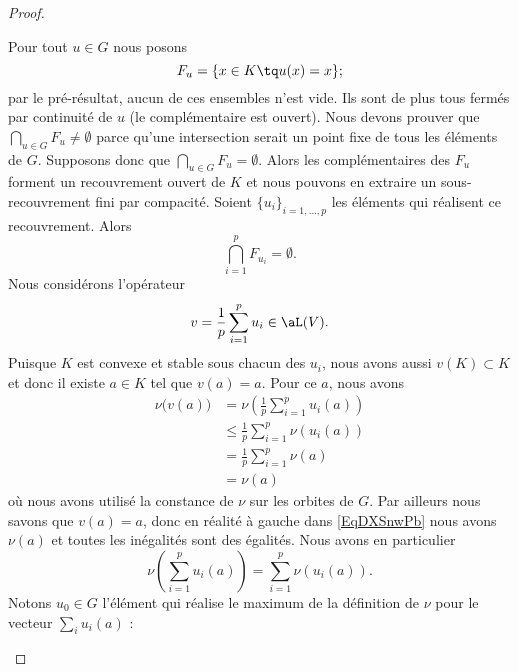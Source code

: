 \begin{proof}
\begin{subproof}
		Pour tout \( u\in G\) nous posons
		\begin{equation}
			F_u=\{ x\in K\tq u(x)=x \};
		\end{equation}
		par le pré-résultat, aucun de ces ensembles n'est vide. Ils sont de plus tous fermés par continuité de \( u\) (le complémentaire est ouvert). Nous devons prouver que \( \bigcap_{u\in G}F_u\neq \emptyset\) parce qu'une intersection serait un point fixe de tous les éléments de \( G\). Supposons donc que \( \bigcap_{u\in G}F_u=\emptyset\). Alors les complémentaires des \( F_u\) forment un recouvrement ouvert de \( K\) et nous pouvons en extraire un sous-recouvrement fini par compacité. Soient \( \{ u_i \}_{i=1,\ldots, p}\) les éléments qui réalisent ce recouvrement. Alors
		\begin{equation}
			\bigcap_{i=1}^pF_{u_i}=\emptyset.
		\end{equation}
		Nous considérons l'opérateur
		\begin{equation}
			v=\frac{1}{ p }\sum_{i=1}^pu_i\in\aL(V).
		\end{equation}
		Puisque \( K\) est convexe et stable sous chacun des \( u_i\), nous avons aussi \( v(K)\subset K\) et donc il existe \( a\in K\) tel que \( v(a)=a\). Pour ce \( a\), nous avons
		\begin{subequations}
			\begin{align}
				\nu\big( v(a) \big) & =\nu\left( \frac{1}{ p }\sum_{i=1}^pu_i(a) \right)      \label{EqDXSnwPb} \\
				                    & \leq \frac{1}{ p }\sum_{i=1}^p\nu\left( u_i(a) \right)                    \\
				                    & =\frac{1}{ p }\sum_{i=1}^p\nu(a)                                          \\
				                    & =\nu(a)
			\end{align}
		\end{subequations}
		où nous avons utilisé la constance de \( \nu\) sur les orbites de \( G\). Par ailleurs nous savons que \( v(a)=a\), donc en réalité à gauche dans \eqref{EqDXSnwPb} nous avons \( \nu(a)\) et toutes les inégalités sont des égalités. Nous avons en particulier
		\begin{equation}        \label{EqBMjypoV}
			\nu\left( \sum_{i=1}^pu_i(a) \right) =\sum_{i=1}^p\nu\left( u_i(a) \right).
		\end{equation}
		Notons \( u_0\in G\) l'élément qui réalise le maximum de la définition de \( \nu\) pour le vecteur \( \sum_iu_i(a)\) :
		\begin{equation}

\end{equation}
\end{subproof}
\end{proof}
